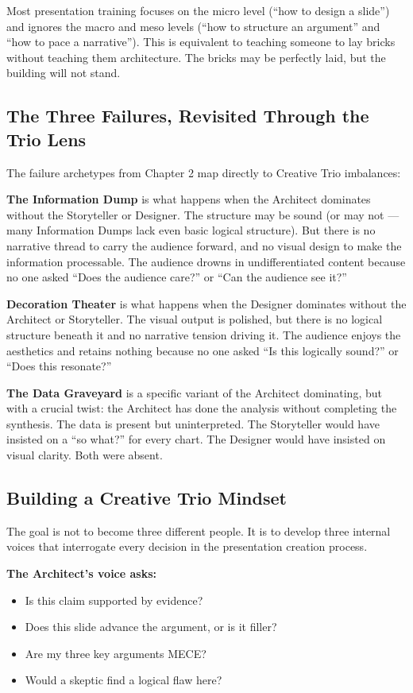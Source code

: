 Most presentation training focuses on the micro level (``how to design a slide'') and ignores the macro and meso levels (``how to structure an argument'' and ``how to pace a narrative''). This is equivalent to teaching someone to lay bricks without teaching them architecture. The bricks may be perfectly laid, but the building will not stand.

\subsection{The Three Failures, Revisited Through the Trio Lens}

The failure archetypes from Chapter 2 map directly to Creative Trio imbalances:

\textbf{The Information Dump} is what happens when the Architect dominates without the Storyteller or Designer. The structure may be sound (or may not --- many Information Dumps lack even basic logical structure). But there is no narrative thread to carry the audience forward, and no visual design to make the information processable. The audience drowns in undifferentiated content because no one asked ``Does the audience care?'' or ``Can the audience see it?''

\textbf{Decoration Theater} is what happens when the Designer dominates without the Architect or Storyteller. The visual output is polished, but there is no logical structure beneath it and no narrative tension driving it. The audience enjoys the aesthetics and retains nothing because no one asked ``Is this logically sound?'' or ``Does this resonate?''

\textbf{The Data Graveyard} is a specific variant of the Architect dominating, but with a crucial twist: the Architect has done the analysis without completing the synthesis. The data is present but uninterpreted. The Storyteller would have insisted on a ``so what?'' for every chart. The Designer would have insisted on visual clarity. Both were absent.

\subsection{Building a Creative Trio Mindset}

The goal is not to become three different people. It is to develop three internal voices that interrogate every decision in the presentation creation process.

\textbf{The Architect's voice asks:}
\begin{itemize}
  \item Is this claim supported by evidence?
  \item Does this slide advance the argument, or is it filler?
  \item Are my three key arguments MECE?
  \item Would a skeptic find a logical flaw here?
\end{itemize}


